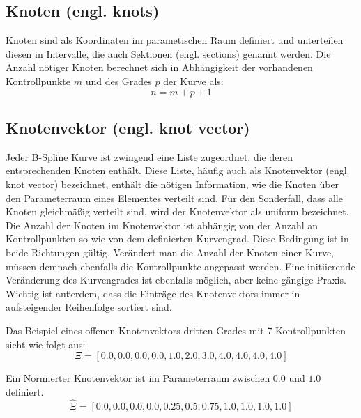\documentclass[german,a4paper,12pt,oneside]{scrbook}
\theoremstyle{definition}
\theoremstyle{definition}
\theoremstyle{definition}
\theoremstyle{definition}
\theoremstyle{definition}
\theoremstyle{definition}
\begin{document}
\subsection{Knoten (engl. knots)}
\label{subsec: Knoten}
Knoten sind als Koordinaten im parametischen Raum definiert und unterteilen diesen in Intervalle, die auch Sektionen (engl. sections) genannt werden. Die Anzahl nötiger Knoten berechnet sich in Abhängigkeit der vorhandenen Kontrollpunkte $m$ und des Grades $p$ der Kurve als: 
\begin{equation*}
        n = m + p + 1
\end{equation*}

\subsection{Knotenvektor (engl. knot vector)}
\label{subsec:knot vector}
Jeder B-Spline Kurve ist zwingend eine Liste zugeordnet, die deren entsprechenden Knoten enthält. Diese Liste, häufig auch als Knotenvektor (engl. knot vector) bezeichnet, enthält die nötigen Information, wie die Knoten über den Parameterraum eines Elementes verteilt sind. Für den Sonderfall, dass alle Knoten gleichmäßig verteilt sind, wird der Knotenvektor als uniform bezeichnet.  Die Anzahl der Knoten im Knotenvektor ist abhängig von der Anzahl an Kontrollpunkten so wie von dem definierten Kurvengrad. Diese Bedingung ist in beide Richtungen gültig. Verändert man die Anzahl der Knoten einer Kurve, müssen demnach ebenfalls die Kontrollpunkte angepasst werden. Eine initiierende Veränderung des Kurvengrades ist ebenfalls möglich, aber keine gängige Praxis. Wichtig ist außerdem, dass die Einträge des Knotenvektors immer in aufsteigender Reihenfolge sortiert sind. 

\vspace{0.5cm}
Das Beispiel eines offenen Knotenvektors dritten Grades mit 7 Kontrollpunkten sieht wie folgt aus:
\begin{equation*}
    \Xi = [0.0, 0.0, 0.0, 0.0, 1.0, 2.0, 3.0, 4.0, 4.0, 4.0, 4.0]
\end{equation*}

\vspace{0.5cm}
Ein Normierter Knotenvektor ist im Parameterraum zwischen $0.0$ und $1.0$ definiert. 
\begin{equation*}
    \hat{\Xi} =  [0.0, 0.0, 0.0, 0.0, 0.25, 0.5, 0.75, 1.0, 1.0, 1.0, 1.0]
\end{equation*}
\end{document}
